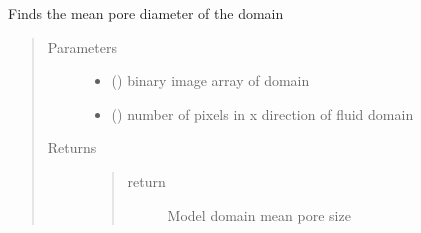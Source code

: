 \documentclass[letterpaper,10pt,english]{sphinxmanual}
\begin{document}
\begin{fulllineitems}
\label{\detokenize{index:lb_colloids.LB.LB_2Dpermeability.get_mean_pore_size}}
Finds the mean pore diameter of the domain
\begin{quote}\begin{description}
\item[{Parameters}] \leavevmode\begin{itemize}
\item {} 
 () \textendash{} binary image array of domain

\item {} 
 () \textendash{} number of pixels in x direction of fluid domain

\end{itemize}

\item[{Returns}] \leavevmode\begin{quote}\begin{description}
\item[{return}] \leavevmode
Model domain mean pore size

\end{description}\end{quote}

\end{description}\end{quote}

\end{fulllineitems}

\end{document}
